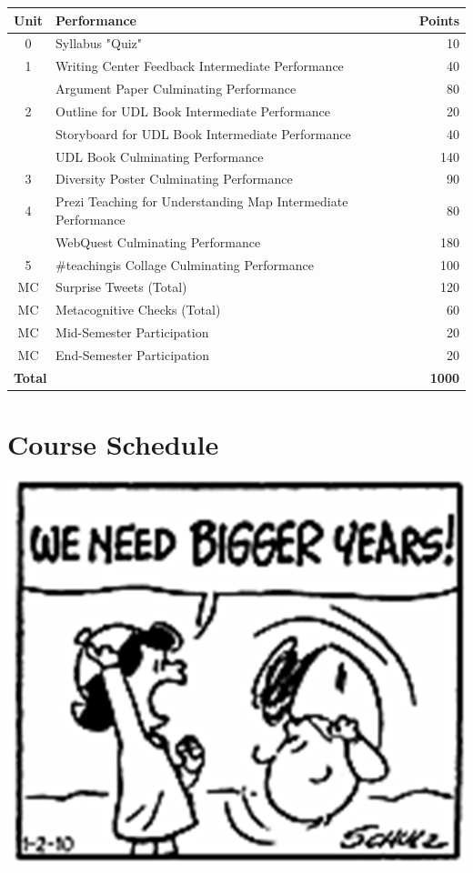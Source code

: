 \documentclass{tufte-handout}
\begin{document}
\begin{tabular}{clr}
	\toprule
	Unit & Performance & Points \\
	\midrule\midrule
	0 & Syllabus "Quiz" & 10 \\
	\midrule
	1 & Writing Center Feedback Intermediate Performance & 40 \\
	& Argument Paper Culminating Performance & 80 \\
	\midrule
	2 & Outline for UDL Book Intermediate Performance & 20 \\
	& Storyboard for UDL Book Intermediate Performance & 40 \\
	& UDL Book Culminating Performance & 140 \\
	\midrule
	3 & Diversity Poster Culminating Performance & 90 \\
	\midrule
	4 & Prezi Teaching for Understanding Map Intermediate Performance  & 80 \\
	& WebQuest Culminating Performance & 180 \\
	\midrule
	5 & \#teachingis Collage Culminating Performance & 100 \\
	\midrule
	MC & Surprise Tweets (Total) & 120 \\
	MC & Metacognitive Checks (Total) & 60 \\
	MC & Mid-Semester Participation & 20 \\
	MC & End-Semester Participation & 20 \\
	\midrule\midrule
	\multicolumn{2}{l}{\textbf{Total}} & \textbf{1000} \\
	\bottomrule
\end{tabular}

\newpage
\part{\faCalendar\medspace Course Schedule \medspace\faCalendar}

\begin{marginfigure}%
	\begin{center}
  \includegraphics[width=0.5\linewidth]{sc-pic.png}
  \label{fig:sc-pic}
	\end{center}
\end{marginfigure}
\end{document}
